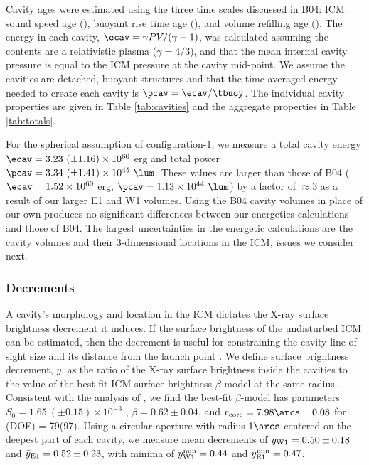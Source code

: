 \documentclass[iop]{emulateapj-rtx4}
\begin{document}
Cavity ages were estimated using the three time scales discussed in
B04: ICM sound speed age (\tsonic), buoyant rise time age (\tbuoy),
and volume refilling age (\trefill). The energy in each cavity, $\ecav
= \gamma PV/(\gamma-1)$, was calculated assuming the contents are a
relativistic plasma ($\gamma = 4/3$), and that the mean internal
cavity pressure is equal to the ICM pressure at the cavity
mid-point. We assume the cavities are detached, buoyant structures and
that the time-averaged energy needed to create each cavity is $\pcav =
\ecav/\tbuoy$. The individual cavity properties are given in Table
\ref{tab:cavities} and the aggregate properties in Table
\ref{tab:totals}.

For the spherical assumption of configuration-1, we measure a total
cavity energy $\ecav = 3.23 ~(\pm 1.16) \times 10^{60}$ erg and total
power $\pcav = 3.34 ~(\pm 1.41) \times 10^{45} ~\lum$. These values
are larger than those of B04 ($\ecav = 1.52 \times 10^{60}$ erg,
$\pcav = 1.13 \times 10^{44} ~\lum$) by a factor of $\approx 3$ as a
result of our larger E1 and W1 volumes. Using the B04 cavity volumes
in place of our own produces no significant differences between our
energetics calculations and those of B04. The largest uncertainties in
the energetic calculations are the cavity volumes and their
3-dimensional locations in the ICM, issues we consider next.

\subsubsection{Decrements}
\label{sec:dec}

A cavity's morphology and location in the ICM dictates the X-ray
surface brightness decrement it induces. If the surface brightness of
the undisturbed ICM can be estimated, then the decrement is useful for
constraining the cavity line-of-sight size and its distance from the
launch point \citep[\ie\ \rlos\ and $z$, respectively; see][for
  details]{hydraa}. We define surface brightness decrement, $y$, as
the ratio of the X-ray surface brightness inside the cavities to the
value of the best-fit ICM surface brightness $\beta$-model at the same
radius. Consistent with the analysis of \citet{schindler01}, we find
the best-fit $\beta$-model has parameters $S_0 = 1.65 ~(\pm 0.15)
\times 10^{-3}$ \sbr, $\beta = 0.62 \pm 0.04$, and $r_{\rm{core}} =
7.98\arcs \pm 0.08$ for \chisq(DOF) = 79(97). Using a circular
aperture with radius $1\arcs$ centered on the deepest part of each
cavity, we measure mean decrements of $\bar{y}_{\rm{W1}} = 0.50 \pm
0.18$ and $\bar{y}_{\rm{E1}} = 0.52 \pm 0.23$, with minima of
$y^{\rm{min}}_{\rm{W1}} = 0.44$ and $y^{\rm{min}}_{\rm{E1}} = 0.47$.
\end{document}
